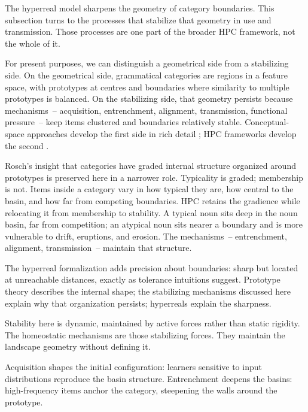 The hyperreal model sharpens the geometry of category boundaries. This subsection turns to the processes that stabilize that geometry in use and transmission. Those processes are one part of the broader HPC framework, not the whole of it.

For present purposes, we can distinguish a geometrical side from a stabilizing side. On the geometrical side, grammatical categories are regions in a feature space, with prototypes at centres and boundaries where similarity to multiple prototypes is balanced. On the stabilizing side, that geometry persists because mechanisms~-- acquisition, entrenchment, alignment, transmission, functional pressure~-- keep items clustered and boundaries relatively stable. Conceptual-space approaches develop the first side in rich detail \citep{gardenfors2000,gardenfors2014}; HPC frameworks develop the second \citep{boyd1991,boyd1999}.

Rosch's insight that categories have graded internal structure organized around prototypes is preserved here in a narrower role. Typicality is graded; membership is not. Items inside a category vary in how typical they are, how central to the basin, and how far from competing boundaries. HPC retains the gradience while relocating it from membership to stability. A typical noun sits deep in the noun basin, far from competition; an atypical noun sits nearer a boundary and is more vulnerable to drift, eruptions, and erosion. The mechanisms~-- entrenchment, alignment, transmission~-- maintain that structure.

The hyperreal formalization adds precision about boundaries: sharp but located at unreachable distances, exactly as tolerance intuitions suggest. Prototype theory describes the internal shape; the stabilizing mechanisms discussed here explain why that organization persists; hyperreals explain the sharpness.

Stability here is dynamic, maintained by active forces rather than static rigidity. The homeostatic mechanisms are those stabilizing forces. They maintain the landscape geometry without defining it.

Acquisition shapes the initial configuration: learners sensitive to input distributions reproduce the basin structure. Entrenchment deepens the basins: high-frequency items anchor the category, steepening the walls around the prototype.

